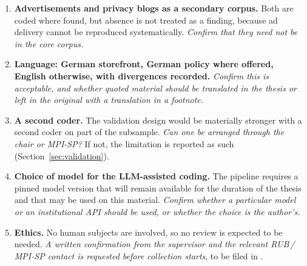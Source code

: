 \begin{enumerate}[leftmargin=*,itemsep=5pt]
  \item \textbf{Advertisements and privacy blogs as a secondary corpus.} Both
    are coded where found, but absence is not treated as a finding, because ad
    delivery cannot be reproduced systematically.
    \emph{Confirm that they need not be in the core corpus.}

  \item \textbf{Language: German storefront, German policy where offered,
    English otherwise, with divergences recorded.}
    \emph{Confirm this is acceptable, and whether quoted material should be
    translated in the thesis or left in the original with a translation in a
    footnote.}

  \item \textbf{A second coder.} The validation design would be materially
    stronger with a second coder on part of the subsample. \emph{Can one be
    arranged through the chair or MPI-SP?} If not, the limitation is reported as
    such (Section~\ref{sec:validation}).

  \item \textbf{Choice of model for the LLM-assisted coding.} The pipeline
    requires a pinned model version that will remain available for the duration
    of the thesis and that may be used on this material. \emph{Confirm whether a
    particular model or an institutional API should be used, or whether the
    choice is the author's.}

  \item \textbf{Ethics.} No human subjects are involved, so no review is
    expected to be needed. \emph{A written confirmation from the supervisor and
    the relevant RUB\,/\,MPI-SP contact is requested before collection starts},
    to be filed in .
\end{enumerate}
